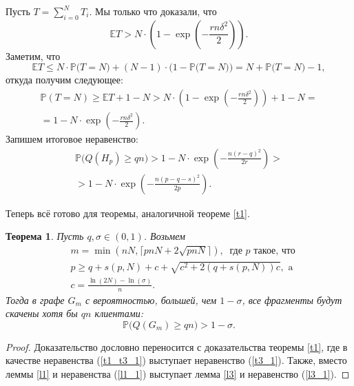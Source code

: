 \documentclass{matmex-diploma-custom}
\newcommand{\Expect}{\mathbb E}
\newcommand{\PRob}{\mathbb P}
\newcommand{\leqs}{\leqslant}
\newcommand{\geqs}{\geqslant}
\newtheorem{theorem}{Теорема}
\theoremstyle{named}
\begin{document}
Пусть $T = \sum\limits_{i = 0}^N T_i$. Мы только что доказали, что
\begin{equation}
\Expect T > N \cdot \left( 1 - \exp \left( - \frac{rn \delta^2}{2} \right) \right).
\end{equation}
Заметим, что 
\begin{equation}
\Expect T \leqs N \cdot \PRob\big(T = N\big) + (N-1) \cdot \Big(1 - \PRob\big(T = N\big)\Big) = N + \PRob\big(T = N\big) - 1,
\end{equation}
откуда получим следующее:
\begin{equation}\begin{aligned}
\PRob(T = N) \geqs \Expect T + 1 - N > N \cdot \left(1 - \exp \left( - \frac{rn \delta^2}{2} \right)\right)  + 1 - N
=
	\\
=
1 - N \cdot \exp \left( - \frac{rn \delta^2}{2} \right).
\end{aligned}\end{equation}
Запишем итоговое неравенство:
\begin{equation}\label{t3_1} \begin{aligned}
\PRob\Big(Q(H_p) \geqs qn \Big) 
	> 
1 - N \cdot \exp\left(- \frac{n (r-q)^2}{2r} \right)
	>
\\ 
	>  
1 - N \cdot \exp\left(- \frac{n (p - q - s)^2}{2p} \right). 
\end{aligned}\end{equation}

\smallskip

Теперь всё готово для теоремы, аналогичной теореме \ref{t1}.

\begin{theorem}\label{t3}
Пусть $q, \sigma \in (0, 1)$. Возьмем 
\begin{align}
& m = \min(nN, \lceil pnN + 2\sqrt{pnN} \rceil), ~ \text{ где $p$ такое, что} 
	\\
& p \geqs q + s(p, N) + c + \sqrt{c^2+2(q+s(p, N))c}, \text{ a} \label{t3_2}
	\\
& c = \frac{\ln(2N) - \ln(\sigma)}{n}.
\end{align}
Тогда в графе $G_m$ с вероятностью, большей, чем $1 - \sigma$, все фрагменты будут скачены хотя бы $qn$ клиентами:
\begin{equation}\label{t3_3}
\PRob\big(Q(G_m) \geqs qn\big) > 1 - \sigma.
\end{equation}
\end{theorem}

\begin{proof}
Доказательство дословно переносится с доказательства теоремы \ref{t1}, 
где в качестве неравенства (\ref{t1_t3_1}) выступает неравенство (\ref{t3_1}). 
Также, вместо леммы \ref{l1} и неравенства (\ref{l1_1}) выступает лемма \ref{l3} и неравенство (\ref{l3_1}).
\end{proof}
\end{document}
